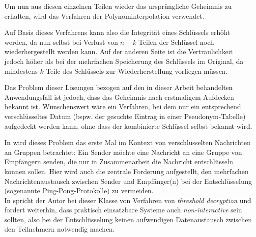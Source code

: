 Um nun aus diesen einzelnen Teilen wieder das ursprüngliche Geheimnis zu erhalten, wird das Verfahren der Polynominterpolation verwendet. 



Auf Basis dieses Verfahrens kann also die Integrität eines Schlüssels erhöht werden, da nun selbst bei Verlust von \(n-k\) Teilen der Schlüssel noch wiederhergestellt werden kann. Auf der anderen Seite ist die Vertraulichkeit jedoch höher als bei der mehrfachen Speicherung des Schlüssels im Original, da mindestens \(k\) Teile des Schlüssels zur Wiederherstellung vorliegen müssen.

Das Problem dieser Lösungen bezogen auf den in dieser Arbeit behandelten Anwendungsfall ist jedoch, dass das Geheimnis nach erstmaligem Aufdecken bekannt ist. Wünschenswert wäre ein Verfahren, bei dem nur ein entsprechend verschlüsseltes Datum (bspw. der gesuchte Eintrag in einer Pseudonym-Tabelle) aufgedeckt werden kann, ohne dass der kombinierte Schlüssel selbst bekannt wird. 



In \cite{desmedt1987} wird dieses Problem das erste Mal im Kontext von verschlüsselten Nachrichten an Gruppen betrachtet: Ein Sender möchte eine Nachricht an eine Gruppe von Empfängern senden, die nur in Zusammenarbeit die Nachricht entschlüsseln können sollen. Hier wird auch die zentrale Forderung aufgestellt, den mehrfachen Nachrichtenaustausch zwischen Sender und Empfänger(n) bei der Entschlüsselung (sogenannte Ping-Pong-Protokolle) zu vermeiden. \\
In \cite{desmedt1993} spricht der Autor bei dieser Klasse von Verfahren von \textit{threshold decryption} und fordert weiterhin, dass praktisch einsatzbare Systeme auch \textit{non-interactive} sein sollten, also bei der Entschlüsselung keinen aufwendigen Datenaustausch zwischen den Teilnehmern notwendig machen.

